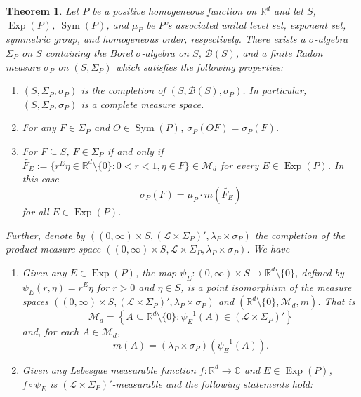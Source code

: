\documentclass[11pt]{article}
\newtheorem{theorem}{Theorem}[section]
\theoremstyle{remark}
\newcommand\Sym{\operatorname{Sym}}
\newcommand\Exp{\operatorname{Exp}}
\begin{document}
\begin{theorem}\label{thm:BestIntegrationFormula} Let $P$ be a positive homogeneous function on $\mathbb{R}^d$ and let $S$, $\Exp(P)$, $\Sym(P)$, and $\mu_P$ be $P$'s associated unital level set, exponent set, symmetric group, and homogeneous order, respectively.
There exists a $\sigma$-algebra $\Sigma_P$ on $S$ containing the Borel $\sigma$-algebra on $S$, $\mathcal{B}(S)$,
and a finite Radon measure $\sigma_P$ on $(S,\Sigma_P)$ which satisfies the following properties:
\begin{enumerate}
\item\label{property:Completion} $(S,\Sigma_P,\sigma_P)$ is the completion of $(S,\mathcal{B}(S),\sigma_P)$. In particular, $(S,\Sigma_P,\sigma_P)$ is a complete measure space.
\item\label{property:Invariance} For any $F\in\Sigma_P$ and $O\in\Sym(P)$, $\sigma_P(OF)=\sigma_P(F)$.
\item\label{property:DefiningConditionofsigma} For $F\subseteq S$, $F\in\Sigma_P$ if and only if $\widetilde{F_E}:=\{r^E\eta\in\mathbb{R}^d\setminus\{0\}:0<r<1,\eta\in F\}\in\mathcal{M}_d$ for every $E\in \Exp(P)$. In this case
\begin{equation*}
    \sigma_P(F)=\mu_P\cdot m(\widetilde{F_E})
\end{equation*}
for all $E\in\Exp(P)$.
\end{enumerate}
Further, denote by $\left((0,\infty)\times S,(\mathcal{L}\times\Sigma_P)',\lambda_P\times\sigma_P\right)$ the completion of the product measure space \break $((0,\infty)\times S,\mathcal{L}\times\Sigma_P,\lambda_P\times\sigma_P)$. We have
\begin{enumerate}
\item\label{property:BestPointIsomorphism} Given any $E\in \Exp(P)$, the map $\psi_E:(0,\infty)\times S\to\mathbb{R}^d\setminus\{0\}$, defined by $\psi_E(r,\eta)=r^E\eta$ for $r>0$ and $\eta\in S$, is a point isomorphism of the measure spaces $\left((0,\infty)\times S,(\mathcal{L}\times\Sigma_P)',\lambda_P\times\sigma_P\right)$ and $(\mathbb{R}^d\setminus\{0\},\mathcal{M}_d,m)$. That is
\begin{equation*}
\mathcal{M}_d=\left\{A\subseteq \mathbb{R}^d\setminus\{0\}:\psi_E^{-1}(A)\in (\mathcal{L}\times\Sigma_P)'\right\}
\end{equation*}
and, for each $A\in\mathcal{M}_d$,
\begin{equation*}
m(A)=(\lambda_P\times\sigma_P)(\psi_E^{-1}(A)).
\end{equation*}
\item\label{property:BestIntegrationFormula} Given any Lebesgue measurable function $f:\mathbb{R}^d\to\mathbb{C}$ and $E\in \Exp(P)$, $f\circ \psi_E$ is $(\mathcal{L}\times\Sigma_P)'$-measurable and the following statements hold:

\end{enumerate}
\end{theorem}
\end{document}
